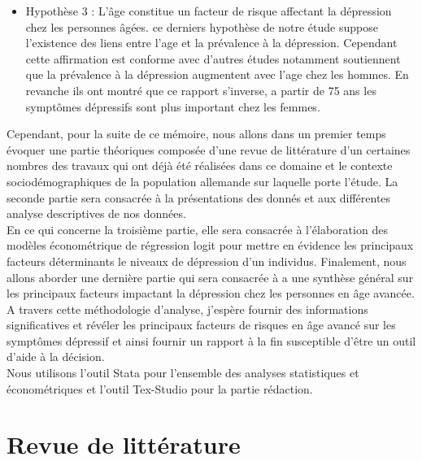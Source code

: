 \documentclass[a4paper]{article}
\begin{document}
\begin{itemize}[label=\textbullet]
			\item Hypothèse 3 : L'âge constitue un facteur de risque affectant la dépression chez les personnes âgées.
			ce derniers hypothèse de notre étude suppose l'existence des liens entre l'age et la prévalence à la dépression. Cependant cette affirmation est conforme avec d'autres études notamment \citep{phac_chronic_diseases} soutiennent que la prévalence à la dépression augmentent avec l'age chez les hommes. En revanche ils ont montré que ce rapport s'inverse, a partir de 75 ans les symptômes dépressifs sont plus important chez les femmes. 
		\end{itemize}
	
	Cependant, pour la suite de ce mémoire, nous allons dans un premier temps évoquer une partie théoriques composée d’une revue de littérature d’un certaines nombres des travaux qui ont déjà été réalisées dans ce domaine et le contexte sociodémographiques de la population allemande sur laquelle porte l’étude.  La seconde partie sera consacrée à la présentations des donnés et aux différentes analyse descriptives de nos données.\\
	
	En ce qui concerne la troisième partie, elle sera consacrée à  l'élaboration des modèles économétrique de régression logit pour mettre en évidence les principaux  facteurs déterminants le niveaux de dépression d’un individus.
	Finalement, nous allons aborder une dernière partie qui sera consacrée à a une synthèse général sur les principaux facteurs impactant la dépression chez les personnes en âge avancée.\\
	
	A travers cette méthodologie d'analyse, j'espère fournir des informations significatives et révéler les principaux facteurs de risques en âge avancé sur les symptômes dépressif et ainsi fournir un rapport à la fin susceptible d'être un outil d'aide à la décision.\\
	Nous utilisons l'outil Stata pour l'ensemble des analyses statistiques et économétriques et l'outil Tex-Studio pour la partie rédaction.
	
	\section{Revue de littérature}  
	
\end{document}
